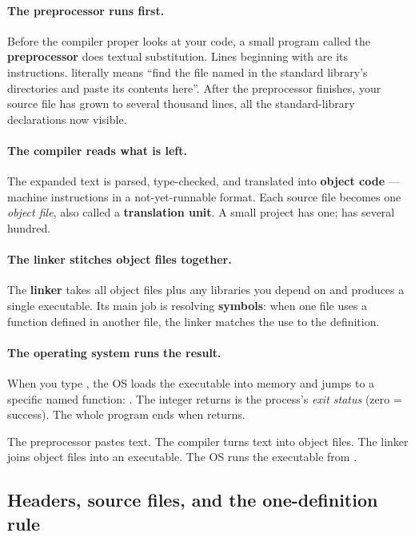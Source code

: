 \paragraph{The preprocessor runs first.}
Before the compiler proper looks at your code, a small program called
the \textbf{preprocessor} does textual substitution. Lines beginning
with \code{\#} are its instructions. 
literally means ``find the file named  in the standard
library's directories and paste its contents here''. After the
preprocessor finishes, your source file has grown to several
thousand lines, all the standard-library declarations now visible.

\paragraph{The compiler reads what is left.}
The expanded text is parsed, type-checked, and translated into
\textbf{object code} --- machine instructions in a not-yet-runnable
format. Each source file becomes one \emph{object file}, also called
a \textbf{translation unit}. A small project has one; \maya{} has
several hundred.

\paragraph{The linker stitches object files together.}
The \textbf{linker} takes all object files plus any libraries you
depend on and produces a single executable. Its main job is
resolving \textbf{symbols}: when one file uses a function defined in
another file, the linker matches the use to the definition.

\paragraph{The operating system runs the result.}
When you type , the OS loads the executable into
memory and jumps to a specific named function: . The
integer  returns is the process's \emph{exit status}
(zero = success). The whole program ends when  returns.

\begin{idea}
The preprocessor pastes text. The compiler turns text into object
files. The linker joins object files into an executable. The OS runs
the executable from .
\end{idea}

\subsection{Headers, source files, and the one-definition rule}

